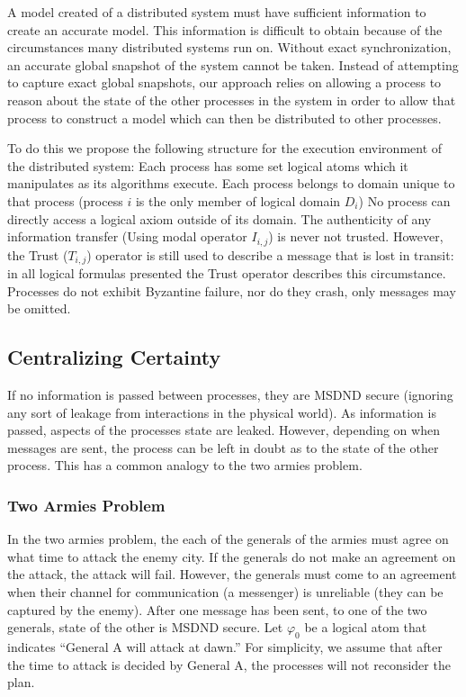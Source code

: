 \documentclass[12pt,oneside]{article}
\begin{document}
A model created of a distributed system must have sufficient information to create an accurate model. This information is difficult to obtain because of the circumstances many distributed systems run on. Without exact synchronization, an accurate global snapshot of the system cannot be taken. Instead of attempting to capture exact global snapshots, our approach relies on allowing a process to reason about the state of the other processes in the system in order to allow that process to construct a model which can then be distributed to other processes.

To do this we propose the following structure for the execution environment of the distributed system:
Each process has some set logical atoms which it manipulates as its algorithms execute.
Each process belongs to domain unique to that process (process $i$ is the only member of logical domain $D_i$)
No process can directly access a logical axiom outside of its domain.
The authenticity of any information transfer (Using modal operator $I_{i,j}$) is never not trusted. However, the Trust ($T_{i,j}$) operator is still used to describe a message that is lost in transit: in all logical formulas presented the Trust operator describes this circumstance.
Processes do not exhibit Byzantine failure, nor do they crash, only messages may be omitted.

\subsection{Centralizing Certainty}


If no information is passed between processes, they are MSDND secure (ignoring any sort of leakage from interactions in the physical world). As information is passed, aspects of the processes state are leaked. However, depending on when messages are sent, the process can be left in doubt as to the state of the other process. This has a common analogy to the two armies problem. 

\subsubsection{Two Armies Problem}

In the two armies problem, the each of the generals of the armies must agree on what time to attack the enemy city. If the generals do not make an agreement on the attack, the attack will fail. However, the generals must come to an agreement when their channel for communication (a messenger) is unreliable (they can be captured by the enemy). After one message has been sent, to one of the two generals, state of the other is MSDND secure. Let $\varphi_0$ be a logical atom that indicates ``General A will attack at dawn.'' For simplicity, we assume that after the time to attack is decided by General A, the processes will not reconsider the plan.
\end{document}
